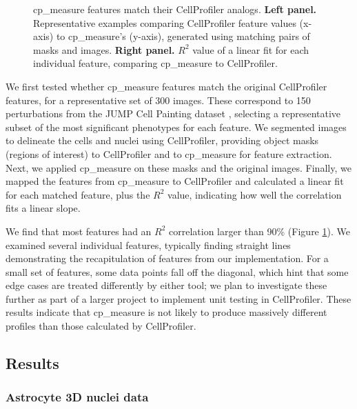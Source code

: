 \documentclass{article}
\begin{document}
\begin{figure}[htbp]
\centering

\caption{\label{fig:cp_vs_cpmeasure}cp\_measure features match their CellProfiler analogs. \textbf{Left panel.} Representative examples comparing CellProfiler feature values (x-axis) to cp\_measure's (y-axis), generated using matching pairs of masks and images. \textbf{Right panel.} \(R^2\) value of a linear fit for each individual feature, comparing cp\_measure to CellProfiler.}
\end{figure}

We first tested whether cp\_measure features match the original CellProfiler features, for a representative set of 300 images. These correspond to 150 perturbations from the JUMP Cell Painting dataset \citep{chandrasekaranJUMPCellPainting2023}, selecting a representative subset of the most significant phenotypes for each feature. We segmented images to delineate the cells and nuclei using CellProfiler, providing object masks (regions of interest) to CellProfiler and to cp\_measure for feature extraction. Next, we applied cp\_measure on these masks and the original images. Finally, we mapped the features from cp\_measure to CellProfiler and calculated a linear fit for each matched feature, plus the \(R^2\) value, indicating how well the correlation fits a linear slope.

We find that most features had an $R^2$ correlation larger than 90\% (Figure \ref{fig:cp_vs_cpmeasure}). We examined several individual features, typically finding straight lines demonstrating the recapitulation of features from our implementation. For a small set of features, some data points fall off the diagonal, which hint that some edge cases are treated differently by either tool; we plan to investigate these further as part of a larger project to implement unit testing in CellProfiler. These results indicate that cp\_measure is not likely to produce massively different profiles than those calculated by CellProfiler.
\subsection{Results}
\label{sec:orge5b5c6b}
\subsubsection{Astrocyte 3D nuclei data}
\label{sec:org447090b}
\end{document}
